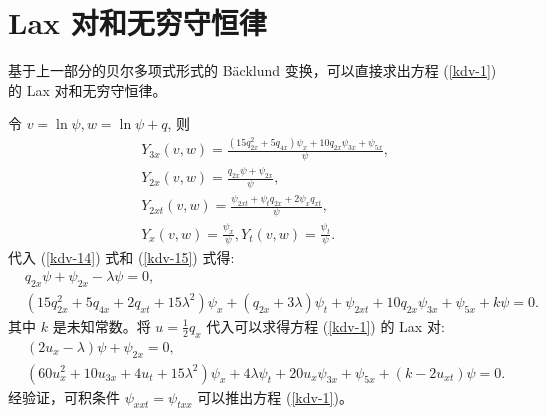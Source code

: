 \section{Lax 对和无穷守恒律}
基于上一部分的贝尔多项式形式的 B\"{a}cklund 变换，可以直接求出方程 (\ref{kdv-1}) 的 Lax 对和无穷守恒律。

令 $v=\ln \psi, w=\ln \psi+q$, 则
\begin{align}
&Y_{3x}(v,w)=\frac{(15q_{2x}^2+5q_{4x})\psi_x+10q_{2x}\psi_{3x}+\psi_{5x}}{\psi},\nonumber\\
&Y_{2x}(v,w)=\frac{q_{2x}\psi+\psi_{2x}}{\psi},\nonumber\\
&Y_{2xt}(v,w)=\frac{\psi_{2xt}+\psi_tq_{2x}+2\psi_xq_{xt}}{\psi},\nonumber\\
&Y_x(v,w)=\frac{\psi_x}{\psi}, Y_t(v,w)=\frac{\psi_t}{\psi}.\nonumber
\end{align}
代入 (\ref{kdv-14}) 式和 (\ref{kdv-15}) 式得:
\begin{align}
&q_{2x}\psi+\psi_{2x}-\lambda\psi=0,\nonumber\\
&(15q_{2x}^2+5q_{4x}+2q_{xt}+15\lambda^2)\psi_x+(q_{2x}+3\lambda)\psi_t+\psi_{2xt}+10q_{2x}\psi_{3x}+\psi_{5x}+k\psi=0.\nonumber
\end{align}
其中 $k$ 是未知常数。将 $u=\frac{1}{2}q_x$ 代入可以求得方程 (\ref{kdv-1}) 的 Lax 对:
\begin{align}
&(2u_x-\lambda)\psi+\psi_{2x}=0,\nonumber\\
&(60u_x^2+10u_{3x}+4u_t+15\lambda^2)\psi_x+4\lambda\psi_t+20u_x\psi_{3x}+\psi_{5x}+(k-2u_{xt})\psi=0.\nonumber
\end{align}
经验证，可积条件 $\psi_{xxt}=\psi_{txx}$ 可以推出方程 (\ref{kdv-1})。

